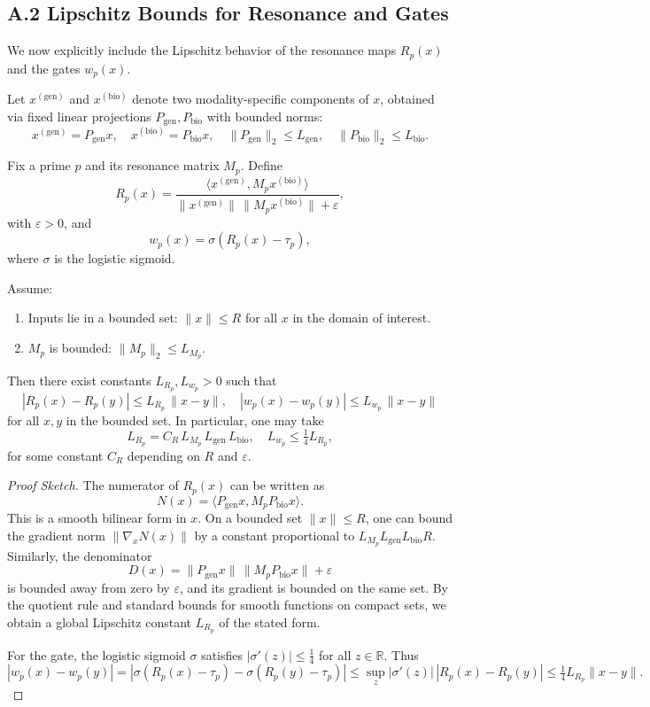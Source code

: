\documentclass[11pt]{article}
\begin{document}
\subsection*{A.2 Lipschitz Bounds for Resonance and Gates}

We now explicitly include the Lipschitz behavior of the resonance maps \(R_p(x)\) and the gates \(w_p(x)\).

Let \(x^{(\mathrm{gen})}\) and \(x^{(\mathrm{bio})}\) denote two modality-specific components of \(x\), obtained via fixed linear projections \(P_{\mathrm{gen}}, P_{\mathrm{bio}}\) with bounded norms:
\[
  x^{(\mathrm{gen})} = P_{\mathrm{gen}} x,
  \quad x^{(\mathrm{bio})} = P_{\mathrm{bio}} x,
  \quad
  \|P_{\mathrm{gen}}\|_2 \leq L_{\mathrm{gen}},
  \quad
  \|P_{\mathrm{bio}}\|_2 \leq L_{\mathrm{bio}}.
\]

Fix a prime \(p\) and its resonance matrix \(M_p\).
Define
\[
  R_p(x) =
  \frac{\langle x^{(\mathrm{gen})}, M_p x^{(\mathrm{bio})} \rangle}
       {\|x^{(\mathrm{gen})}\|\,\|M_p x^{(\mathrm{bio})}\| + \varepsilon},
\]
with \(\varepsilon > 0\), and
\[
  w_p(x) = \sigma(R_p(x) - \tau_p),
\]
where \(\sigma\) is the logistic sigmoid.

\begin{lemma}
Assume:
\begin{enumerate}[label=(\roman*),leftmargin=*]
  \item Inputs lie in a bounded set:
        \(\|x\| \leq R\) for all \(x\) in the domain of interest.
  \item \(M_p\) is bounded: \(\|M_p\|_2 \leq L_{M_p}\).
\end{enumerate}
Then there exist constants \(L_{R_p}, L_{w_p} > 0\) such that
\[
  |R_p(x) - R_p(y)| \leq L_{R_p} \,\|x-y\|,
  \quad
  |w_p(x) - w_p(y)| \leq L_{w_p} \,\|x-y\|
\]
for all \(x,y\) in the bounded set.
In particular, one may take
\[
  L_{R_p} =
    C_R \, L_{M_p}\,L_{\mathrm{gen}}\,L_{\mathrm{bio}},
  \quad
  L_{w_p} \leq \tfrac{1}{4} L_{R_p},
\]
for some constant \(C_R\) depending on \(R\) and \(\varepsilon\).
\end{lemma}

\begin{proof}[Proof Sketch]
The numerator of \(R_p(x)\) can be written as
\[
  N(x) = \langle P_{\mathrm{gen}} x, M_p P_{\mathrm{bio}} x \rangle.
\]
This is a smooth bilinear form in \(x\).
On a bounded set \(\|x\|\leq R\), one can bound the gradient norm
\(\|\nabla_x N(x)\|\) by a constant proportional to \(L_{M_p} L_{\mathrm{gen}} L_{\mathrm{bio}} R\).
Similarly, the denominator
\[
  D(x) = \|P_{\mathrm{gen}}x\|\,\|M_p P_{\mathrm{bio}}x\| + \varepsilon
\]
is bounded away from zero by \(\varepsilon\), and its gradient is bounded on the same set.
By the quotient rule and standard bounds for smooth functions on compact sets, we obtain a global Lipschitz constant \(L_{R_p}\) of the stated form.

For the gate, the logistic sigmoid \(\sigma\) satisfies \(|\sigma'(z)| \leq \tfrac{1}{4}\) for all \(z \in \mathbb{R}\).
Thus
\[
  |w_p(x) - w_p(y)| =
  |\sigma(R_p(x)-\tau_p) - \sigma(R_p(y)-\tau_p)|
  \leq \sup_z |\sigma'(z)|\,|R_p(x)-R_p(y)|
  \leq \tfrac{1}{4} L_{R_p} \|x-y\|.
\]
\end{proof}
\end{document}
